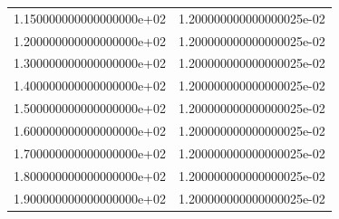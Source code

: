 \begin{table}
\begin{tabular}{|S|S|}
    1.150000000000000000e+02 & 1.200000000000000025e-02\\
    1.200000000000000000e+02 & 1.200000000000000025e-02\\
    1.300000000000000000e+02 & 1.200000000000000025e-02\\
    1.400000000000000000e+02 & 1.200000000000000025e-02\\
    1.500000000000000000e+02 & 1.200000000000000025e-02\\
    1.600000000000000000e+02 & 1.200000000000000025e-02\\
    1.700000000000000000e+02 & 1.200000000000000025e-02\\
    1.800000000000000000e+02 & 1.200000000000000025e-02\\
    1.900000000000000000e+02 & 1.200000000000000025e-02\\
    \bottomrule
  \end{tabular}
\end{table}

